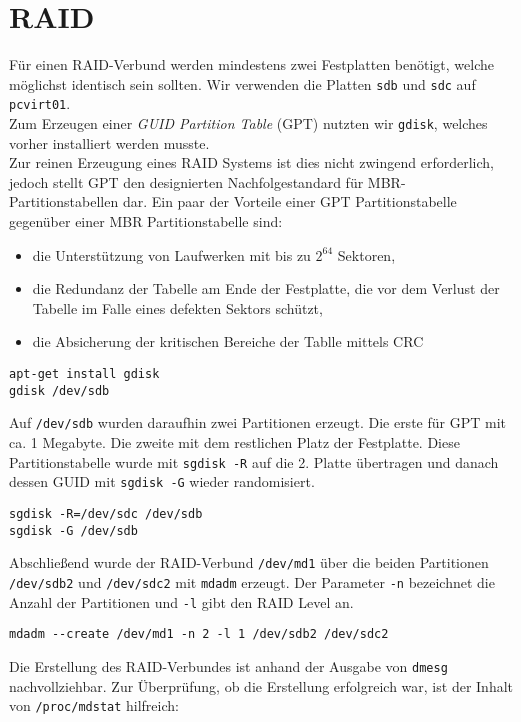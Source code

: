 \section{RAID}
\label{raid}
Für einen RAID-Verbund werden mindestens zwei Festplatten benötigt, welche möglichst identisch sein sollten. Wir verwenden die Platten \verb#sdb# und \verb#sdc# auf \verb#pcvirt01#. \\
Zum Erzeugen einer \emph{GUID Partition Table} (GPT) nutzten wir \verb#gdisk#, welches vorher installiert werden musste. \\ 
Zur reinen Erzeugung eines RAID Systems ist dies nicht zwingend erforderlich, jedoch stellt GPT den designierten Nachfolgestandard für MBR-Partitionstabellen dar. Ein paar der Vorteile einer GPT Partitionstabelle gegenüber einer MBR Partitionstabelle sind\cite{gpt}:
\begin{itemize} 
\item die Unterstützung von Laufwerken mit bis zu $2^{64}$ Sektoren,
\item die Redundanz der Tabelle am Ende der Festplatte, die vor dem Verlust der Tabelle im Falle eines defekten Sektors schützt,
\item die Absicherung der kritischen Bereiche der Tablle mittels CRC
\end{itemize}
\begin{verbatim}
apt-get install gdisk
gdisk /dev/sdb
\end{verbatim}
Auf \verb#/dev/sdb# wurden daraufhin zwei Partitionen erzeugt. Die erste für GPT mit ca. 1 Megabyte. Die zweite mit dem restlichen Platz der Festplatte.
Diese Partitionstabelle wurde mit \verb#sgdisk -R# auf die 2. Platte übertragen und danach dessen GUID mit \verb#sgdisk -G# wieder randomisiert.
\begin{verbatim}
sgdisk -R=/dev/sdc /dev/sdb
sgdisk -G /dev/sdb
\end{verbatim}
Abschließend wurde der RAID-Verbund \verb#/dev/md1# über die beiden Partitionen \verb#/dev/sdb2# und \verb#/dev/sdc2# mit \verb#mdadm# erzeugt. Der Parameter \verb#-n# bezeichnet die Anzahl der Partitionen und \verb#-l# gibt den RAID Level an.
\begin{verbatim}
mdadm --create /dev/md1 -n 2 -l 1 /dev/sdb2 /dev/sdc2
\end{verbatim}
Die Erstellung des RAID-Verbundes ist anhand der Ausgabe von \verb#dmesg# nachvollziehbar. Zur Überprüfung, ob die Erstellung erfolgreich war, ist der Inhalt von \verb#/proc/mdstat# hilfreich: 
